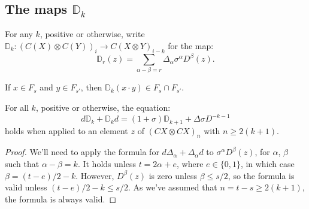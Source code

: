 \documentclass[10pt]{article}
\newcommand{\twist}{\sigma}
\begin{document}
\begin{AdamsSSEQ operations final}
\subsection{The maps $\mathbb{D}_k$}

For any $k$, positive or otherwise, write $\mathbb{D}_k:(C(X)\otimes C(Y))_i\to C(X\otimes Y)_{i-k}$ for the map:
\[\mathbb{D}_r(z)= \sum_{\alpha-\beta=r}\Delta_\alpha\twist^\alpha D^\beta(z).
\]
\begin{lem}\label{DkIsNiceToFiltration}
If $x\in F_s$ and $y\in F_{s'}$, then $\mathbb{D}_k(x\cdot y)\in F_s\cap F_{s'}$.
\end{lem}
\begin{lem}\label{boundaryVsBBD}
For all $k$, positive or otherwise, the equation:
\[d\mathbb{D}_k+\mathbb{D}_kd= (1+\twist)\mathbb{D}_{k+1}+\Delta\sigma D^{-k-1}\]
holds when applied to an element $z$ of $(CX\otimes CX)_{n}$ with $n\geq 2(k+1)$.
\end{lem}
\begin{proof}
\newcommand{\twolinesum}[2]{\mathop{\sum_{\mathclap{#1}}}_{\mathclap{#2}}}
\newcommand{\onelinesum}[1]{\sum_{\mathclap{#1}}}
We'll need to apply the formula for $d\Delta_\alpha+\Delta_\alpha d$ to $\twist^\alpha D^\beta(z)$, for $\alpha$, $\beta$ such that $\alpha-\beta=k$. %
It holds unless $t=2\alpha+e$, where $e\in\{0,1\}$, in which case $\beta=(t-e)/2-k$. However, $D^\beta(z)$ is zero unless $\beta\leq s/2$, so the formula is valid unless $(t-e)/2-k\leq s/2$. As we've assumed that $n=t-s\geq2(k+1)$, the formula is always valid.


\end{proof}
\end{AdamsSSEQ operations final}
\end{document}
